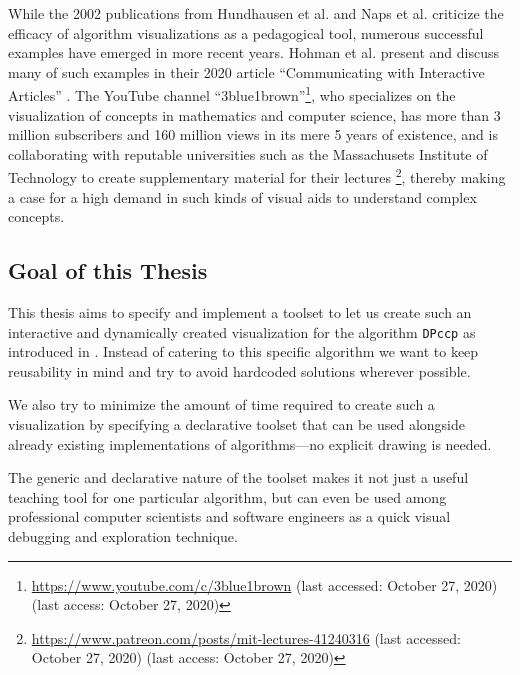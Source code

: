 
While the 2002 publications from Hundhausen et al. \cite{hundhausen2002meta} and Naps et al. \cite{naps2002exploring} criticize the efficacy of algorithm visualizations as a pedagogical tool, numerous successful examples have emerged in more recent years.
Hohman et al. present and discuss many of such examples in their 2020 article ``Communicating with Interactive Articles'' \cite{hohman2020communicating}.
The YouTube channel ``3blue1brown''\footnote{\url{https://www.youtube.com/c/3blue1brown} (last accessed: October 27, 2020) (last access: October 27, 2020)}, who specializes on the visualization of concepts in mathematics and computer science, has more than 3 million subscribers and 160 million views in its mere 5 years of existence, and is collaborating with reputable universities such as the Massachusets Institute of Technology to create supplementary material for their lectures \footnote{\url{https://www.patreon.com/posts/mit-lectures-41240316} (last accessed: October 27, 2020) (last access: October 27, 2020)}, thereby making a case for a high demand in such kinds of visual aids to understand complex concepts.

\subsection{Goal of this Thesis}
This thesis aims to specify and implement a toolset to let us create such an interactive and dynamically created visualization for the algorithm \texttt{DPccp} as introduced in \cite{moerkotte2006analysis}. Instead of catering to  this specific algorithm we want to keep reusability in mind and try to avoid hardcoded solutions wherever possible.

We also try to minimize the amount of time required to create such a visualization by specifying a declarative toolset that can be used alongside already existing implementations of algorithms—no explicit drawing is needed.

The generic and declarative nature of the toolset makes it not just a useful teaching tool for one particular algorithm, but can even be used among professional computer scientists and software engineers as a quick visual debugging and exploration technique.


